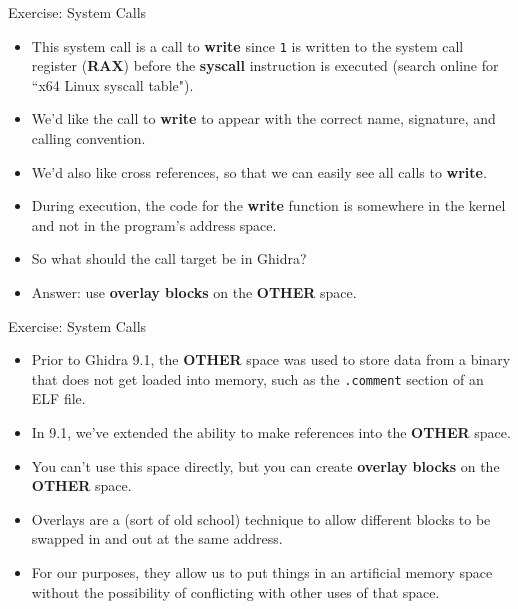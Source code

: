 \documentclass{beamer}
\begin{document}
\begin{frame}
\begin{block}{Exercise: System Calls}
\begin{itemize}
\item This system call is a call to \textbf{write} since \texttt{1} is written to the system call register (\textbf{RAX}) before the \textbf{syscall}
instruction is executed (search online for ``x64 Linux syscall table").
\item We'd like the call to \textbf{write} to appear with the correct name, signature, and calling convention.
\item We'd also like cross references, so that we can easily see all calls to \textbf{write}.
\item During execution, the code for the \textbf{write} function is somewhere in the kernel and not in the program's address space.
\item So what should the call target be in Ghidra?
\item Answer: use \textbf{overlay blocks} on the \textbf{OTHER} space.
\end{itemize}
\end{block}
\end{frame}

\begin{frame}
\begin{block}{Exercise: System Calls}
\begin{itemize}
\item Prior to Ghidra 9.1, the \textbf{OTHER} space was used to store data from a binary that does not get loaded into memory, such as the \texttt{.comment} section of an ELF file.
\item In 9.1, we've extended the ability to make references into the \textbf{OTHER} space.
\item You can't use this space directly, but you can create \textbf{overlay blocks} on the \textbf{OTHER} space.
\item Overlays are a (sort of old school) technique to allow different blocks to be swapped in and out at the same address.
\item For our purposes, they allow us to put things in an artificial memory space without the possibility of conflicting with other uses of that space.
\end{itemize}
\end{block}
\end{frame}
\end{document}
